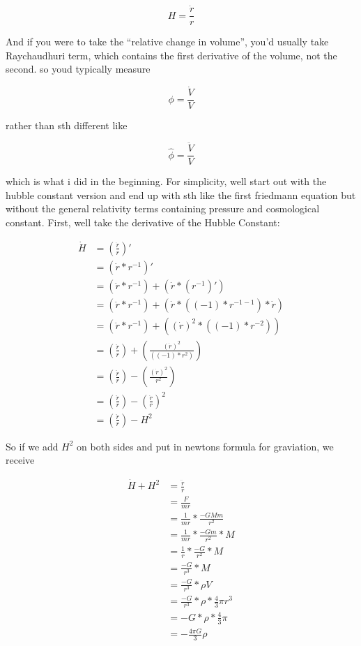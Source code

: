 \documentclass{article}
\begin{document}
$$H = \frac{\dot{r}}{r}$$

And if you were to take the ``relative change in volume'', you'd usually take Raychaudhuri term, which contains the first derivative of the volume, not the second. 
so youd typically measure 

$$\phi =  \frac{\dot{V}}{V}$$

rather than sth different like

$$\hat{\phi} =  \frac{\ddot{V}}{V}$$

which is what i did in the beginning. For simplicity, well start out with the hubble constant version and end up with sth like the first friedmann equation but without the general relativity terms containing pressure and cosmological constant. First, well take the derivative of the Hubble Constant:

\begin{equation}
\begin{aligned}
\dot{H} &= (\frac{\dot{r}}{r})' \\ 
&=(\dot{r}*r^{-1})'\\
&=(\ddot{r}*r^{-1})+(\dot{r}*(r^{-1})')\\
&=(\ddot{r}*r^{-1})+(\dot{r}*((-1)*r^{-1-1}) * \dot{r})\\
&=(\ddot{r}*r^{-1})+((\dot{r})^{2}*((-1)*r^{-2}) )\\
&=(\frac{\ddot{r}}{r})+(\frac{(\dot{r})^{2}}{((-1)*r^{2})} )\\
&=(\frac{\ddot{r}}{r})-(\frac{(\dot{r})^{2}}{r^{2}} )\\
&=(\frac{\ddot{r}}{r})-(\frac{\dot{r}}{r} )^2\\
&=(\frac{\ddot{r}}{r})-H^2
\end{aligned}
\end{equation}

So if we add $H^2$ on both sides and put in newtons formula for graviation, we receive

\begin{equation}
\begin{aligned}
\dot{H} + H^2 &=\frac{\ddot{r}}{r}\\ 
&=\frac{F}{mr}\\ 
&=\frac{1}{mr}*\frac{-GMm}{r^2}\\ 
&=\frac{1}{mr}*\frac{-Gm}{r^2}* M\\ 
&=\frac{1}{r}*\frac{-G}{r^2}* M\\ 
&=\frac{-G}{r^3}* M\\ 
&=\frac{-G}{r^3}* \rho V\\ 
&=\frac{-G}{r^3}* \rho * \frac{4}{3} \pi r^3\\ 
&=-G* \rho * \frac{4}{3} \pi\\ 
&=-\frac{4 \pi G}{3}\rho\\ 
\end{aligned}
\end{equation}
\end{document}
